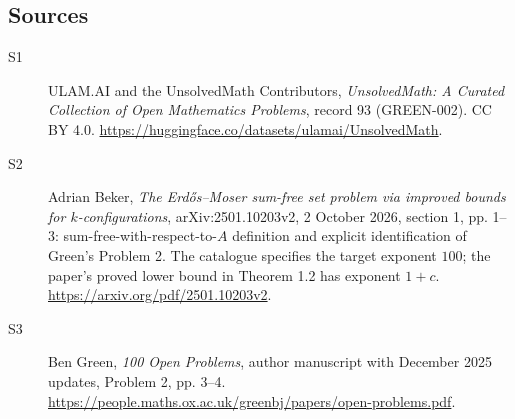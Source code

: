\documentclass[11pt]{article}
\begin{document}
\subsection{Sources}
\begin{description}
\item[\hypertarget{source:93:1}{S1}] ULAM.AI and the UnsolvedMath Contributors, \emph{UnsolvedMath: A Curated Collection of Open Mathematics Problems}, record 93 (GREEN-002). CC BY 4.0. \url{https://huggingface.co/datasets/ulamai/UnsolvedMath}.
\item[\hypertarget{source:93:2}{S2}] Adrian Beker, \emph{The Erdős--Moser sum-free set problem via improved bounds for $k$-configurations}, arXiv:2501.10203v2, 2 October 2026, section 1, pp. 1--3: sum-free-with-respect-to-$A$ definition and explicit identification of Green's Problem 2. The catalogue specifies the target exponent $100$; the paper's proved lower bound in Theorem 1.2 has exponent $1+c$. \url{https://arxiv.org/pdf/2501.10203v2}.
\item[\hypertarget{source:93:3}{S3}] Ben Green, \emph{100 Open Problems}, author manuscript with December 2025 updates, Problem 2, pp. 3--4. \url{https://people.maths.ox.ac.uk/greenbj/papers/open-problems.pdf}.
\end{description}
\label{end:93}
\end{document}
